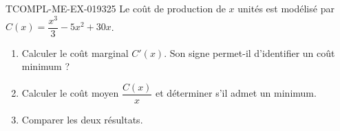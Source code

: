 \begin{exercice}{TCOMPL-ME-EX-019}{3}{25}
Le coût de production de $x$ unités est modélisé par $C(x) = \dfrac{x^3}{3} - 5x^2 + 30x$.
\begin{enumerate}
  \item Calculer le coût marginal $C'(x)$. Son signe permet-il d'identifier un coût minimum ?
  \item Calculer le coût moyen $\dfrac{C(x)}{x}$ et déterminer s'il admet un minimum.
  \item Comparer les deux résultats.
\end{enumerate}

\end{exercice}
